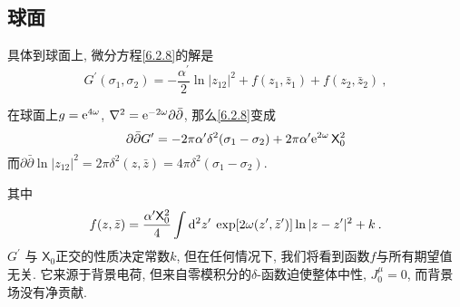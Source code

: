 \subsection*{球面}
具体到球面上, 微分方程\eqref{6.2.8}的解是
\begin{equation}
	G^{\prime}(\sigma_{1}, \sigma_{2})=-\frac{\alpha^{\prime}}{2} \ln |z_{12}|^{2}+f(z_{1}, \bar{z}_{1})+f(z_{2}, \bar{z}_{2}) \:, \label{6.2.9}
\end{equation}
\begin{tcolorbox}
	\begin{remark}
		在球面上$g=\mathrm{e}^{4 \omega}$, $\nabla^{2}=\mathrm{e}^{-2 \omega} \partial \bar{\partial}$, 那么\eqref{6.2.8}变成
		\[
		\partial \bar{\partial} G^{\prime}=-2 \pi \alpha^{\prime} \delta^{2}(\sigma_{1}-\sigma_{2})
		+2 \pi \alpha^{\prime} \mathrm{e}^{2 \omega}\,\mathsf{X}_{0}^{2} 
		\]
		而$
		\partial \bar{\partial} \ln |z_{12}|^{2}=2 \pi \delta^{2}(z, \bar{z})=4 \pi \delta^{2}(\sigma_{1}-\sigma_{2})
		$.
		\end{remark}
\end{tcolorbox}
\noindent 其中
\begin{equation}
	f(z, \bar{z})=\frac{\alpha^{\prime} \mathsf{X}_{0}^{2}}{4} 
	\int \mathrm{d}^{2} z^{\prime}\: \exp [2 \omega(z^{\prime}, \bar{z}^{\prime})] \ln|z-z^{\prime}|^{2}+k \:. \label{6.2.10}
\end{equation}
$G^{\prime}$ 与 $\mathsf{X}_{0}$正交的性质决定常数$k$, 但在任何情况下, 我们将看到函数$f$与所有期望值无关. 
它来源于背景电荷, 但来自零模积分的$\delta$-函数迫使整体中性,  $J_{0}^{\mu}=0$, 而背景场没有净贡献.

